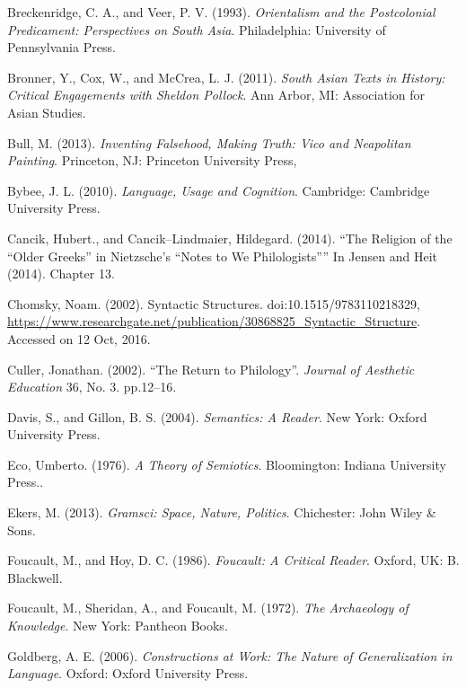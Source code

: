 \begin{thebibliography}{99}
 Breckenridge, C. A., and Veer, P. V. (1993). \textit{Orientalism and the Postcolonial Predicament: Perspectives on South Asia}. Philadelphia: University of Pennsylvania Press.

  Bronner, Y., Cox, W., and McCrea, L. J. (2011). \textit{South Asian Texts in History: Critical Engagements with Sheldon Pollock}. Ann Arbor, MI: Association for Asian Studies.

  Bull, M. (2013). \textit{Inventing Falsehood, Making Truth: Vico and Neapolitan Painting}. Princeton, NJ: Princeton University Press,

  Bybee, J. L. (2010). \textit{Language, Usage and Cognition}. Cambridge: Cambridge University Press.

  Cancik, Hubert., and Cancik–Lindmaier, Hildegard. (2014). “The Religion of the “Older Greeks” in Nietzsche’s “Notes to We Philologists”” In Jensen and Heit (2014). Chapter 13.

  Chomsky, Noam. (2002). Syntactic Structures. doi:10.1515/9783110218329, \url{https://www.researchgate.net/publication/30868825_Syntactic_Structure}. Accessed on 12 Oct, 2016.

  Culler, Jonathan. (2002). “The Return to Philology”. \textit{Journal of Aesthetic Education} 36, No. 3. pp.12–16.

  Davis, S., and Gillon, B. S. (2004). \textit{Semantics: A Reader}. New York: Oxford University Press.

  Eco, Umberto. (1976). \textit{A Theory of Semiotics}. Bloomington: Indiana University Press..

  Ekers, M. (2013). \textit{Gramsci: Space, Nature, Politics}. Chichester: John Wiley \& Sons.

  Foucault, M., and Hoy, D. C. (1986). \textit{Foucault: A Critical Reader}. Oxford, UK: B. Blackwell.

  Foucault, M., Sheridan, A., and Foucault, M. (1972). \textit{The Archaeology of Knowledge}. New York: Pantheon Books.

  Goldberg, A. E. (2006). \textit{Constructions at Work: The Nature of Generalization in Language}. Oxford: Oxford University Press.


\end{thebibliography}
